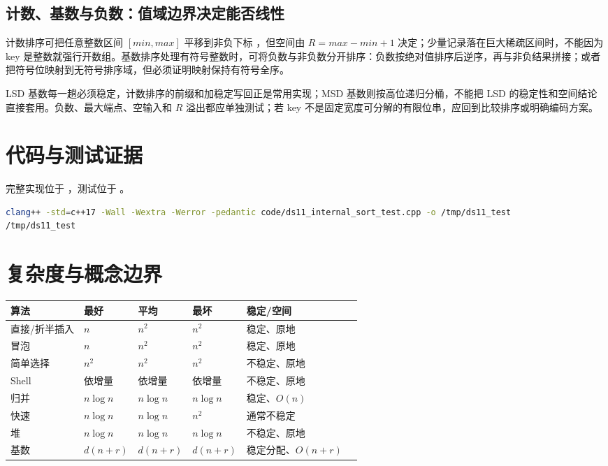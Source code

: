 \documentclass[UTF8,fontset=none,11pt,a4paper]{ctexart}
\begin{document}
\subsection{计数、基数与负数：值域边界决定能否线性}
计数排序可把任意整数区间 $[min,max]$ 平移到非负下标 ，但空间由 $R=max-min+1$ 决定；少量记录落在巨大稀疏区间时，不能因为 key 是整数就强行开数组。基数排序处理有符号整数时，可将负数与非负数分开排序：负数按绝对值排序后逆序，再与非负结果拼接；或者把符号位映射到无符号排序域，但必须证明映射保持有符号全序。

LSD 基数每一趟必须稳定，计数排序的前缀和加稳定写回正是常用实现；MSD 基数则按高位递归分桶，不能把 LSD 的稳定性和空间结论直接套用。负数、最大端点、空输入和 $R$ 溢出都应单独测试；若 key 不是固定宽度可分解的有限位串，应回到比较排序或明确编码方案。

\section{代码与测试证据}
完整实现位于 ，测试位于 。


\begin{lstlisting}[language=bash]
clang++ -std=c++17 -Wall -Wextra -Werror -pedantic code/ds11_internal_sort_test.cpp -o /tmp/ds11_test
/tmp/ds11_test
\end{lstlisting}

\section{复杂度与概念边界}
\begin{center}\small
\begin{tabularx}{\linewidth}{L{2.4cm}C{1.7cm}C{1.7cm}C{1.4cm}YY}\toprule
算法 & 最好 & 平均 & 最坏 & 稳定/空间\\\midrule
直接/折半插入 & $n$ & $n^2$ & $n^2$ & 稳定、原地\\
冒泡 & $n$ & $n^2$ & $n^2$ & 稳定、原地\\
简单选择 & $n^2$ & $n^2$ & $n^2$ & 不稳定、原地\\
Shell & 依增量 & 依增量 & 依增量 & 不稳定、原地\\
归并 & $n\log n$ & $n\log n$ & $n\log n$ & 稳定、$O(n)$\\
快速 & $n\log n$ & $n\log n$ & $n^2$ & 通常不稳定\\
堆 & $n\log n$ & $n\log n$ & $n\log n$ & 不稳定、原地\\
基数 & $d(n+r)$ & $d(n+r)$ & $d(n+r)$ & 稳定分配、$O(n+r)$\\\bottomrule\end{tabularx}\end{center}
\end{document}
